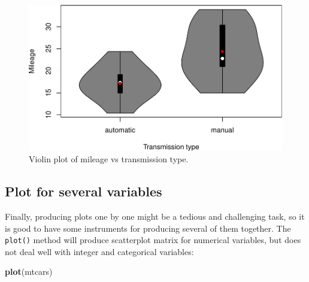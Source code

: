 \documentclass[
]{book}
\newenvironment{Shaded}{\begin{snugshade}}{\end{snugshade}}
\newcommand{\DataTypeTok}[1]{\textcolor[rgb]{0.13,0.29,0.53}{#1}}
\newcommand{\DecValTok}[1]{\textcolor[rgb]{0.00,0.00,0.81}{#1}}
\newcommand{\KeywordTok}[1]{\textcolor[rgb]{0.13,0.29,0.53}{\textbf{#1}}}
\newcommand{\NormalTok}[1]{#1}
\newcommand{\OperatorTok}[1]{\textcolor[rgb]{0.81,0.36,0.00}{\textbf{#1}}}
\newcommand{\StringTok}[1]{\textcolor[rgb]{0.31,0.60,0.02}{#1}}
\theoremstyle{definition}
\theoremstyle{definition}
\theoremstyle{definition}
\theoremstyle{definition}
\theoremstyle{remark}
\begin{document}
\begin{Shaded}
\end{Shaded}

\begin{figure}
\centering
\includegraphics{Svetunkov---Statistics-for-Business-Analytics_files/figure-latex/vioAMMPG-1.pdf}
\caption{\label{fig:vioAMMPG}Violin plot of mileage vs transmission type.}
\end{figure}

\hypertarget{plot-for-several-variables}{%
\subsection{Plot for several variables}\label{plot-for-several-variables}}

Finally, producing plots one by one might be a tedious and challenging task, so it is good to have some instruments for producing several of them together. The \texttt{plot()} method will produce scatterplot matrix for numerical variables, but does not deal well with integer and categorical variables:

\begin{Shaded}
\begin{Highlighting}[]
\KeywordTok{plot}\NormalTok{(mtcars)}
\end{Highlighting}
\end{Shaded}
\end{document}
